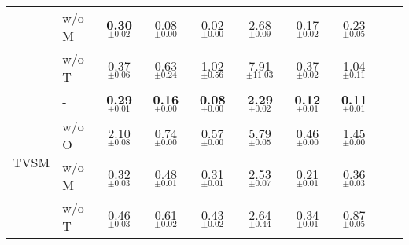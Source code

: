 \begin{table}[t]
\begin{center}
\begin{small}
\begin{sc}
\begin{tabular}{llcccccccc}
                             & w/o M & \textbf{0.30}$_{\pm \mathbf{0.02}}$ & 0.08$_{\pm 0.00}$ & 0.02$_{\pm 0.00}$ & 2.68$_{\pm 0.09}$ & 0.17$_{\pm 0.02}$ & 0.23$_{\pm 0.05}$ & \\
                             & w/o T & 0.37$_{\pm 0.06}$ & 0.63$_{\pm 0.24}$ & 1.02$_{\pm 0.56}$ & 7.91$_{\pm 11.03}$ & 0.37$_{\pm 0.02}$ & 1.04$_{\pm 0.11}$ & \\
\midrule
\multirow{4}{*}{TVSM} & -     & \textbf{0.29}$_{\pm \mathbf{0.01}}$ & \textbf{0.16}$_{\pm \mathbf{0.00}}$ & \textbf{0.08}$_{\pm \mathbf{0.00}}$ & \textbf{2.29}$_{\pm \mathbf{0.02}}$ & \textbf{0.12}$_{\pm \mathbf{0.01}}$ & \textbf{0.11}$_{\pm \mathbf{0.01}}$ & \\
                             & w/o O & 2.10$_{\pm 0.08}$ & 0.74$_{\pm 0.00}$ & 0.57$_{\pm 0.00}$ & 5.79$_{\pm 0.05}$ & 0.46$_{\pm 0.00}$ & 1.45$_{\pm 0.00}$ & \\
                             & w/o M & 0.32$_{\pm 0.03}$ & 0.48$_{\pm 0.01}$ & 0.31$_{\pm 0.01}$ & 2.53$_{\pm 0.07}$ & 0.21$_{\pm 0.01}$ & 0.36$_{\pm 0.03}$ & \\
                             & w/o T & 0.46$_{\pm 0.03}$ & 0.61$_{\pm 0.02}$ & 0.43$_{\pm 0.02}$ & 2.64$_{\pm 0.44}$ & 0.34$_{\pm 0.01}$ & 0.87$_{\pm 0.05}$ & \\
\bottomrule
\end{tabular}
\end{sc}
\end{small}
\end{center}
\vskip -0.1in
\end{table}
